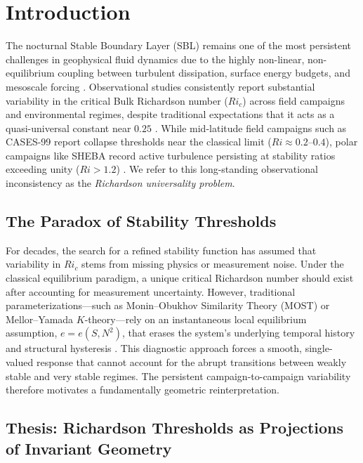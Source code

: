 \section{Introduction}

The nocturnal Stable Boundary Layer (SBL) remains one of the most persistent challenges in geophysical fluid dynamics due to the highly non-linear, non-equilibrium coupling between turbulent dissipation, surface energy budgets, and mesoscale forcing \citep{nieuwstadt1984, mahrt2014, vanDeWiel2017}. Observational studies consistently report substantial variability in the critical Bulk Richardson number ($Ri_c$) across field campaigns and environmental regimes, despite traditional expectations that it acts as a quasi-universal constant near $0.25$ \citep{Grachev2013, Monahan2015}. While mid-latitude field campaigns such as CASES-99 report collapse thresholds near the classical limit ($Ri \approx 0.2\text{--}0.4$), polar campaigns like SHEBA record active turbulence persisting at stability ratios exceeding unity ($Ri > 1.2$) \citep{poulos2002cases99, Grachev2005}. We refer to this long-standing observational inconsistency as the \emph{Richardson universality problem}.

\subsection{The Paradox of Stability Thresholds}

For decades, the search for a refined stability function has assumed that variability in $Ri_c$ stems from missing physics or measurement noise. Under the classical equilibrium paradigm, a unique critical Richardson number should exist after accounting for measurement uncertainty. However, traditional parameterizations---such as Monin--Obukhov Similarity Theory (MOST) or Mellor--Yamada $K$-theory---rely on an instantaneous local equilibrium assumption, $e = e(S, N^2)$, that erases the system's underlying temporal history and structural hysteresis \citep{MellorYamada1982}. This diagnostic approach forces a smooth, single-valued response that cannot account for the abrupt transitions between weakly stable and very stable regimes. The persistent campaign-to-campaign variability therefore motivates a fundamentally geometric reinterpretation.

\subsection{Thesis: Richardson Thresholds as Projections of Invariant Geometry}


